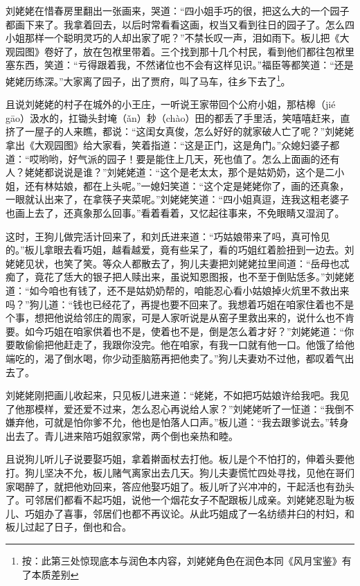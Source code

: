 \documentclass[12pt,oneside]{book}
\begin{document}
刘姥姥在惜春房里翻出一张画来，哭道：“四小姐手巧的很，把这么大的一个园子都画下来了。我拿着回去，以后时常看看这画，权当又看到往日的园子了。怎么四小姐那样一个聪明灵巧的人却出家了呢？”不禁长叹一声，泪如雨下。板儿把《大观园图》卷好了，放在包袱里带着。三个找到那十几个村民，看到他们都往包袱里塞东西，笑道：“亏得跟着我，不然诸位也不会有这样见识。”福臣等都笑道：“还是姥姥历练深。”大家离了园子，出了贾府，叫了马车，往乡下去了\footnote{按：此第三处惊现底本与润色本内容，刘姥姥角色在润色本同《风月宝鉴》有了本质差别}。


且说刘姥姥的村子在城外的小王庄，一听说王家带回个公府小姐，那桔槔（jié gāo）汲水的，扛锄头封埯（ǎn）耖（chào）田的都丢了手里活，笑嘻嘻赶来，直挤了一屋子的人来瞧，都说：“这闺女真俊，怎么好好的就家破人亡了呢？”刘姥姥拿出《大观园图》给大家看，笑着指道：“这是正门，这是角门。”众媳妇婆子都道：“哎哟哟，好气派的园子！要是能住上几天，死也值了。怎么上面画的还有人？姥姥都说说是谁？”刘姥姥道：“这个是老太太，那个是姑奶奶，这个是二小姐，还有林姑娘，都在上头呢。”一媳妇笑道：“这个定是姥姥你了，画的还真象，一眼就认出来了，在拿筷子夹菜呢。”刘姥姥笑道：“四小姐真逗，连我这粗老婆子也画上去了，还真象那么回事。”看着看着，又忆起往事来，不免眼睛又湿润了。

这时，王狗儿做完活计回来了，和刘氏进来道：“巧姑娘带来了吗，真可怜见的。”板儿拿眼去看巧姐，越看越爱，竟有些呆了，看的巧姐红着脸扭到一边去。刘姥姥见状，也笑了笑。等众人都散去了，狗儿夫妻把刘姥姥拉里间道：“岳母也忒痴了，竟花了恁大的银子把人赎出来，虽说知恩图报，也不至于倒贴恁多。”刘姥姥道：“如今咱也有钱了，还不是姑奶奶帮的，咱能忍心看小姑娘掉火炕里不救出来吗？”狗儿道：“钱也已经花了，再提也要不回来了。我想着巧姐在咱家住着也不是个事，想把他说给邻庄的周家，可是人家听说是从窑子里救出来的，说什么也不肯要。如今巧姐在咱家供着也不是，使着也不是，倒是怎么着才好？”刘姥姥道：“你要敢偷偷把他赶走了，我跟你没完。他在咱家，有我一口就有他一口。他饿了给他端吃的，渴了倒水喝，你少动歪脑筋再把他卖了。”狗儿夫妻劝不过他，都叹着气出去了。

刘姥姥刚把画儿收起来，只见板儿进来道：“姥姥，不如把巧姑娘许给我吧。我见了他那模样，爱还爱不过来，怎么忍心再说给人家？”刘姥姥听了一怔道：“我倒不嫌弃他，可就是怕你爹不允，他也是怕落人口声。”板儿道：“我去跟爹说去。”转身出去了。青儿进来陪巧姐叙家常，两个倒也亲热和睦。

且说狗儿听儿子说要娶巧姐，拿着擀面杖去打他。板儿是个不怕打的，伸着头要他打。狗儿坚决不允，板儿赌气离家出去几天。狗儿夫妻慌忙四处寻找，见他在哥们家喝醉了，就把他劝回来，答应他娶巧姐了。板儿听了兴冲冲的，干起活也有劲头了。可邻居们都看不起巧姐，说他一个烟花女子不配跟板儿成亲。刘姥姥忍耻为板儿、巧姐办了喜事，邻居们也都不再议论。从此巧姐成了一名纺绩井臼的村妇，和板儿过起了日子，倒也和合。
\end{document}

